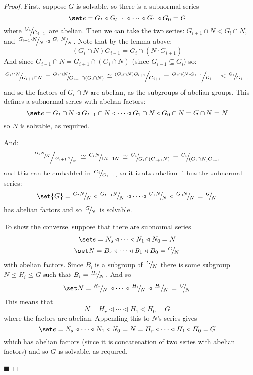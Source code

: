 \documentclass[10pt]{article}
\def\slfrac#1#2{\left.{}^{#1}\mkern-4mu\middle/\mkern-3mu{}_{#2}\right.}
\def\normal{\mathrel\triangleleft}
\begin{document}
\begin{proof}

    First, suppose $G$ is solvable, so there is a subnormal series
    \[ \set e = G_t \normal G_{t-1} \normal \cdots \normal G_1 \normal G_0 = G \]
    where $\slfrac{G_i}{G_{i+1}}$ are abelian.
    Then we can take the two series: $G_{i+1}\cap N\normal G_i\cap N$, and $\slfrac{G_{i+1}\cdot N}N\normal\slfrac{G_i\cdot N}N$.
    Note that by the lemma above:
    \[ (G_i\cap N)G_{i+1} = G_i\cap(N\cdot G_{i+1}) \]
    And since $G_{i+1}\cap N=G_{i+1}\cap(G_i\cap N)$ (since $G_{i+1}\subseteq G_i$) so:
    \[ \slfrac{G_i\cap N}{G_{i+1}\cap N} = \slfrac{G_i\cap N}{G_{i+1}\cap(G_i\cap N)} \cong \slfrac{(G_i\cap N)G_{i+1}}{G_{i+1}} = \slfrac{G_i\cap(N\cdot G_{i+1}}{G_{i+1}} \leq \slfrac{G_i}{G_{i+1}} \]
    and so the factors of $G_i\cap N$ are abelian, as the subgroups of abelian groups.
    This defines a subnormal series with abelian factors:
    \[ \set e = G_t\cap N \normal G_{t-1}\cap N \normal \cdots \normal G_1\cap N \normal G_0\cap N = G\cap N = N \]
    so $N$ is solvable, as required.

    And:
    \[ \slfrac{\slfrac{G_iN}{N}}{\slfrac{G_{i+1}N}{N}} \cong \slfrac{G_iN}{G{i+1}N} \cong \slfrac{G_i}{G_i\cap(G_{i+1}N)} = \slfrac{G_i}{(G_i\cap N)G_{i+1}} \]
    and this can be embedded in $\slfrac{G_i}{G_{i+1}}$, so it is also abelian.
    Thus the subnormal series:
    \[ \set{G} = \slfrac{G_tN}{N} \normal \slfrac{G_{t-1}N}N \normal \cdots \normal \slfrac{G_1N}N \normal \slfrac{G_0N}N = \slfrac{G}N \]
    has abelian factors and so $\slfrac GN$ is solvable.

    To show the converse, suppose that there are subnormal series
    \begin{gather*}
        \set e = N_s \normal \cdots \normal N_1 \normal N_0 = N \\
        \set N = B_r \normal \cdots \normal B_1 \normal B_0 = \slfrac GN
    \end{gather*}
    with abelian factors.
    Since $B_i$ is a subgroup of $\slfrac GN$ there is some subgroup $N\leq H_i\leq G$ such that $B_i=\slfrac{H_i}N$.
    And so
    \[ \set N = \slfrac{H_r}N \normal \cdots \normal \slfrac{H_1}N \normal \slfrac{H_0}N = \slfrac GN \]
    This means that
    \[ N = H_r \normal \cdots \normal H_1 \normal H_0 = G \]
    where the factors are abelian.
    Appending this to $N$'s series gives
    \[ \set e = N_s \normal \cdots \normal N_1 \normal N_0 = N = H_r \normal \cdots \normal H_1 \normal H_0 = G \]
    which has abelian factors (since it is concatenation of two series with abelian factors) and so $G$ is solvable, as required.

    \hfill$\blacksquare$

\end{proof}
\end{document}
